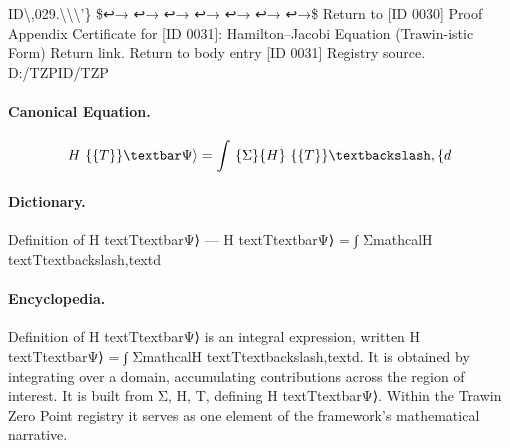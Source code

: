ID\textbackslash{},029.\textbackslash{}\textbackslash{}\textbackslash{}'\} \$↩→ ↩→ ↩→ ↩→ ↩→ ↩→ ↩→\$ Return to [ID 0030] Proof Appendix Certificate for [ID 0031]: Hamilton–Jacobi Equation (Trawin-istic Form) Return link. Return to body entry [ID 0031] Registry source. D:/TZPID/TZP

\paragraph{Canonical Equation.}
\[
H\ \{\text\{T\}\}\textbar\Psi\rangle = \int\ \{\Sigma\}\mathcal\{H\}\ \{\text\{T\}\}\textbackslash,\text\{d
\]

\paragraph{Dictionary.}
Definition of H textTtextbarΨ⟩ — H textTtextbarΨ⟩ = ∫ ΣmathcalH textTtextbackslash,textd

\paragraph{Encyclopedia.}
Definition of H textTtextbarΨ⟩ is an integral expression, written H textTtextbarΨ⟩ = ∫ ΣmathcalH textTtextbackslash,textd. It is obtained by integrating over a domain, accumulating contributions across the region of interest. It is built from Σ, H, T, defining H textTtextbarΨ⟩. Within the Trawin Zero Point registry it serves as one element of the framework's mathematical narrative.
